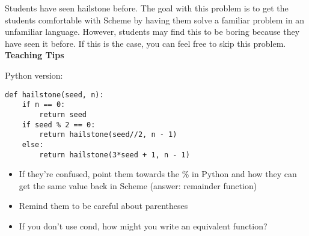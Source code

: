 \begin{guide}
\begin{blocksection}
Students have seen hailstone before. The goal with this problem is to get the students comfortable with Scheme by having them solve a familiar problem in an unfamiliar language. However, students may find this to be boring because they have seen it before. If this is the case, you can feel free to skip this problem. 
\textbf{Teaching Tips}

Python version:
\begin{lstlisting}
def hailstone(seed, n):
    if n == 0:
        return seed
    if seed % 2 == 0:
        return hailstone(seed//2, n - 1)
    else:
        return hailstone(3*seed + 1, n - 1)
\end{lstlisting}
\begin{itemize}
    \item If they’re confused, point them towards the \% in Python and how they can get the same value back in Scheme (answer: remainder function) 
    \item Remind them to be careful about parentheses
    \item If you don’t use cond, how might you write an equivalent function? 
\end{itemize}
\end{blocksection}
\end{guide}